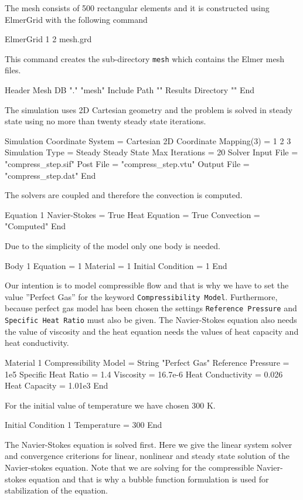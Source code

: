 \begin{flushleft}

The mesh consists of 500 rectangular elements and it is constructed using ElmerGrid with the following command

\ttbegin
ElmerGrid 1 2 mesh.grd
\ttend

This command creates the sub-directory {\tt mesh} which contains the Elmer mesh files.

\ttbegin
Header
  Mesh DB "." "mesh"
  Include Path ""
  Results Directory ""
End
\ttend

The simulation uses 2D Cartesian geometry and the problem is solved in steady state using no more than twenty steady state iterations.

\ttbegin
Simulation
  Coordinate System =  Cartesian 2D
  Coordinate Mapping(3) = 1 2 3
  Simulation Type = Steady
  Steady State Max Iterations = 20
  Solver Input File = "compress_step.sif"
  Post File = "compress_step.vtu"
  Output File = "compress_step.dat"
End
\ttend

The solvers are coupled and therefore the convection is computed. 

\ttbegin
Equation 1
  Navier-Stokes = True
  Heat Equation = True
  Convection = "Computed"
End
\ttend

Due to the simplicity of the model only one body is needed.

\ttbegin
Body 1
  Equation = 1
  Material = 1
  Initial Condition = 1
End
\ttend

Our intention is to model compressible flow and that is why we have to set the value ''Perfect Gas'' for the keyword {\tt Compressibility Model}. Furthermore, because perfect gas model has been chosen the settings {\tt Reference Pressure} and {\tt Specific Heat Ratio} must also be given. The Navier-Stokes equation also needs the value of viscosity and the heat equation needs the values of heat capacity and heat conductivity.

\ttbegin
Material 1
  Compressibility Model = String "Perfect Gas"
  Reference Pressure = 1e5
  Specific Heat Ratio = 1.4
  Viscosity = 16.7e-6
  Heat Conductivity = 0.026
  Heat Capacity = 1.01e3
End
\ttend

For the initial value of temperature we have chosen 300 K.

\ttbegin
Initial Condition 1
  Temperature = 300
End
\ttend

The Navier-Stokes equation is solved first. Here we give the linear system solver and convergence criterions for linear, nonlinear and steady state solution of the Navier-stokes equation. Note that we are solving for the compressible Navier-stokes equation and that is why a bubble function formulation is used for stabilization of the equation.



\end{flushleft}
